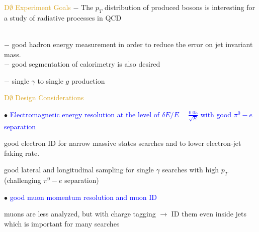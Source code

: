 \begin{frame}{\textcolor{Goldenrod}{D$\emptyset$ Experiment Goals}}
  $- $ The $p_T$ distribution of produced bosons is interesting for a
  study of radiative processes in QCD

\item {}\\
  $- $ good hadron energy measurement in order to reduce the error on jet
  invariant mass.\\
  $- $ good segmentation of calorimetry is also desired
  
\item {} 
  $- $ single $\gamma$ to single $g$ production 
  \tti
  
\end{frame}


\begin{frame}{\textcolor{Goldenrod}{D$\emptyset$ Design Considerations}}
  \itt
\item[$\bullet$]
  \textcolor{blue}{Electromagnetic energy resolution at the level of $\delta E / E
    = \frac{0.05}{\sqrt{E}}$ with good $\pi^0-e $ separation}
  {\small
    \itt
  \item good electron ID for narrow massive states searches and
    to lower electron-jet faking rate. \\
  \item good lateral and longitudinal sampling for single $\gamma$
    searches with high $p_T$ (\alert{challenging $\pi^0-e $ separation})
    \tti
  }
  
\item[$\bullet$]
  \textcolor{blue}{good muon momentum resolution and
    muon ID}
  {\small
    \itt
  \item muons are less analyzed, but with charge tagging $\to$ ID them even inside
    jets which is important for many searches
    \tti
  }
  \tti
\end{frame}


